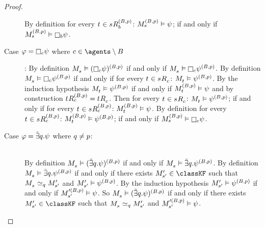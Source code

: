 \begin{proof}
\begin{description}
        By definition for every $\kStateT \in \kSuccessorsB[(\agentsB, \atomP)]{\kStateS}$: $\kPModel[(\agentsB, \atomP)]{\kStateS} \entails \psi$; if and only if $\kPModel[(\agentsB, \atomP)]{\kStateS} \entails \necessaryB \psi$.
    \item[Case $\phi = \necessaryC \psi$ where $\agentC \in \agents \setminus \agentsB$]:
        By definition $\kPModel{\kStateS} \entails (\necessaryC \psi)^{(\agentsB, \atomP)}$ if and only if $\kPModel{\kStateS} \entails \necessaryC \psi^{(\agentsB, \atomP)}$.
        By definition $\kPModel{\kStateS} \entails \necessaryC \psi^{(\agentsB, \atomP)}$ if and only if for every $\kStateT \in \kSuccessorsC{\kStateS}$: $\kPModel{\kStateT} \entails \psi^{(\agentsB, \atomP)}$.
        By the induction hypothesis $\kPModel{\kStateT} \entails \psi^{(\agentsB, \atomP)}$ if and only if $\kPModel[(\agentsB, \atomP)]{\kStateT} \entails \psi$ and by construction $\kSuccessorsC[(\agentsB, \atomP)]{\kStateT} = \kSuccessorsC{\kStateT}$.
        Then for every $\kStateT \in \kSuccessorsC{\kStateS}$: $\kPModel{\kStateT} \entails \psi^{(\agentsB, \atomP)}$; if and only if for every $\kStateT \in \kSuccessorsC[(\agentsB, \atomP)]{\kStateS}$: $\kPModel[(\agentsB, \atomP)]{\kStateT} \entails \psi$.
        By definition for every $\kStateT \in \kSuccessorsC[(\agentsB, \atomP)]{\kStateS}$: $\kPModel[(\agentsB, \atomP)]{\kStateT} \entails \psi^{(\agentsB, \atomP)}$; if and only if $\kPModel[(\agentsB, \atomP)]{\kStateS} \entails \necessaryC \psi$. 
    \item[Case $\phi = \somebisimsQ \psi$ where $\atomQ \neq \atomP$:] \hfill\\
        By definition $\kPModel{\kStateS} \entails (\somebisimsQ \psi)^{(\agentsB, \atomP)}$ if and only if $\kPModel{\kStateS} \entails \somebisimsQ \psi^{(\agentsB, \atomP)}$.
        By definition $\kPModel{\kStateS} \entails \somebisimsQ \psi^{(\agentsB, \atomP)}$ if and only if there exists $\kPModelP{\kStateSP} \in \classKF$ such that $\kPModel{\kStateS} \bisimilar[\atomQ] \kPModelP{\kStateSP}$ and $\kPModelP{\kStateSP} \entails \psi^{(\agentsB, \atomP)}$.
        By the induction hypothesis $\kPModelP{\kStateSP} \entails \psi^{(\agentsB, \atomP)}$ if and only if $\kPModel[\prime(\agentsB, \atomP)]{\kStateSP} \entails \psi$.
        So $\kPModel{\kStateS} \entails (\somebisimsQ \psi)^{(\agentsB, \atomP)}$ if and only if there exists $\kPModelP{\kStateSP} \in \classKF$ such that $\kPModel{\kStateS} \bisimilar[\atomQ] \kPModelP{\kStateSP}$ and $\kPModel[\prime(\agentsB, \atomP)]{\kStateSP} \entails \psi$.


\end{description}
\end{proof}

